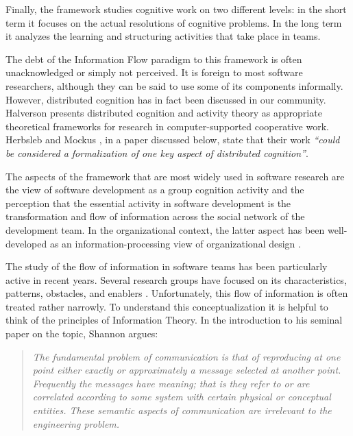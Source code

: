 Finally, the framework studies cognitive work on two different levels: in the short term it focuses on the actual resolutions of cognitive problems. In the long term it analyzes the learning and structuring activities that take place in teams.

The debt of the Information Flow paradigm to this framework is often unacknowledged or simply not perceived. It is foreign to most software researchers, although they can be said to use some of its components informally. However, distributed cognition has in fact been discussed in our community. Halverson  presents distributed cognition and activity theory as appropriate theoretical frameworks for research in computer-supported cooperative work. Herbsleb and Mockus , in a paper discussed below, state that their work \emph{``could be considered a formalization of one key aspect of distributed cognition''}.

The aspects of the framework that are most widely used in software research are the view of software development as a group cognition activity and the perception that the essential activity in software development is the transformation and flow of information across the social network of the development team. In the organizational context, the latter aspect has been well-developed as an information-processing view of organizational design \cite{March1958,Galbraith1974,Tushman1978}.

The study of the flow of information in software teams has been particularly active in recent years. Several research groups have focused on its characteristics, patterns, obstacles, and enablers \cite{Cataldo2009,Nagappan2008,Damian2007}. Unfortunately, this flow of information is often treated rather narrowly. To understand this conceptualization it is helpful to think of the principles of Information Theory. In the introduction to his seminal paper on the topic, Shannon argues:

\begin{quote}
\emph{The fundamental problem of communication is that of reproducing at one point either exactly or approximately a message selected at another point. Frequently the messages have \emph{meaning}; that is they refer to or are correlated according to some system with certain physical or conceptual entities. These semantic aspects of communication are irrelevant to the engineering problem.} \cite{Shannon1948}
\end{quote}

